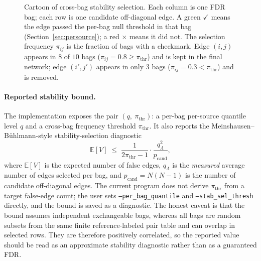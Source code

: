 \documentclass[11pt]{article}
\begin{document}
\begin{figure}[ht]
\caption{Cartoon of cross-bag stability selection. Each column is one FDR bag;
each row is one candidate off-diagonal edge. A green \(\bm{\checkmark}\) means
the edge passed the per-bag null threshold in that bag (Section~\ref{sec:persource});
a red \(\bm{\times}\) means it did not. The selection frequency
\(\pi_{ij}\) is the fraction of bags with a checkmark. Edge \((i,j)\) appears
in \(8\) of \(10\) bags (\(\pi_{ij}=0.8\ge\pi_{\text{thr}}\)) and is kept in
the final network; edge \((i',j')\) appears in only \(3\) bags
(\(\pi_{ij}=0.3<\pi_{\text{thr}}\)) and is removed.}
\label{fig:stability-selection-cartoon}
\end{figure}

\paragraph{Reported stability bound.} The implementation exposes the pair
\((q,\ \pi_{\text{thr}})\): a per-bag per-source quantile level \(q\) and a
cross-bag frequency threshold \(\pi_{\text{thr}}\). It also reports the
Meinshausen--B\"uhlmann-style stability-selection diagnostic
\[
\mathbb{E}[V]\;\le\;\frac{1}{2\pi_{\text{thr}}-1}\cdot\frac{q_\Lambda^{2}}{p_{\text{cand}}},
\]
where \(\mathbb{E}[V]\) is the expected number of false edges,
\(q_\Lambda\) is the \emph{measured} average number of edges selected per bag,
and \(p_{\text{cand}}=N(N-1)\) is the number of candidate off-diagonal edges.
The current program does not derive \(\pi_{\text{thr}}\) from a target false-edge
count; the user sets \texttt{--per\_bag\_quantile} and \texttt{--stab\_sel\_thresh}
directly, and the bound is saved as a diagnostic. The honest caveat is that
the bound assumes independent exchangeable bags, whereas all bags are random
subsets from the same finite reference-labeled pair table and can overlap in
selected rows. They are therefore positively correlated, so the reported
value should be read as an approximate stability diagnostic rather than as a
guaranteed FDR.

\end{document}
